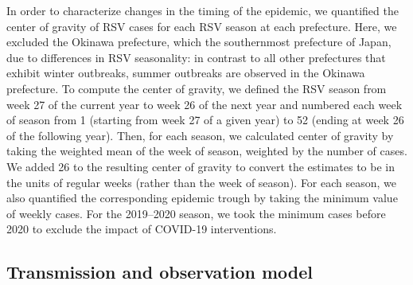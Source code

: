\documentclass[12pt]{article}
\begin{document}
In order to characterize changes in the timing of the epidemic, we quantified the center of gravity of RSV cases for each RSV season at each prefecture.
Here, we excluded the Okinawa prefecture, which the southernmost prefecture of Japan, due to differences in RSV seasonality:
in contrast to all other prefectures that exhibit winter outbreaks, summer outbreaks are observed in the Okinawa prefecture.
To compute the center of gravity, we defined the RSV season from week 27 of the current year to week 26 of the next year and numbered each week of season from 1 (starting from week 27 of a given year) to 52 (ending at week 26 of the following year).
Then, for each season, we calculated center of gravity by taking the weighted mean of the week of season, weighted by the number of cases.
We added 26 to the resulting center of gravity to convert the estimates to be in the units of regular weeks (rather than the week of season).
For each season, we also quantified the corresponding epidemic trough by taking the minimum value of weekly cases.
For the 2019--2020 season, we took the minimum cases before 2020 to exclude the impact of COVID-19 interventions.

\subsection*{Transmission and observation model}
\end{document}
